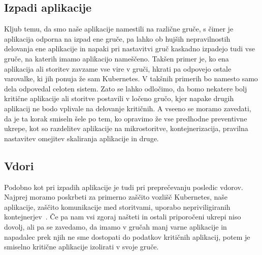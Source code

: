 \documentclass[a4paper, 12pt]{book}
\begin{document}
\subsection{Izpadi aplikacije}
Kljub temu, da smo naše aplikacije namestili na različne gruče, s čimer je aplikacija odporna na izpad ene gruče, pa lahko ob hujših nepravilnostih delovanja ene aplikacije in napaki pri nastavitvi gruč kaskadno izpadejo tudi vse gruče, na katerih imamo aplikacijo nameščeno.
Takšen primer je, ko ena aplikacija ali storitev zavzame vse vire v gruči, hkrati pa odpovejo ostale varovalke, ki jih ponuja že sam Kubernetes.
V takšnih primerih bo namesto samo dela odpovedal celoten sistem.
Zato se lahko odločimo, da bomo nekatere bolj kritične aplikacije ali storitve postavili v ločeno gručo, kjer napake drugih aplikacij ne bodo vplivale na delovanje kritičnih.
A vseeno se moramo zavedati, da je ta korak smiseln šele po tem, ko opravimo že vse predhodne preventivne ukrepe, kot so razdelitev aplikacije na mikrostoritve, kontejnerizacija, pravilna nastavitev omejitev skaliranja aplikacije in druge.
\subsection{Vdori}
Podobno kot pri izpadih aplikacije je tudi pri preprečevanju posledic vdorov.
Najprej moramo poskrbeti za primerno zaščito vozlišč Kubernetes, naše aplikacije, zaščito komunikacije med storitvami, uporabo nepriviligiranih kontejnerjev~\cite{securing-kube}.
Če pa nam vsi zgoraj našteti in ostali priporočeni ukrepi niso dovolj, ali pa se zavedamo, da imamo v gručah manj varne aplikacije in napadalec prek njih ne sme dostopati do podatkov kritičnih aplikacij, potem je smiselno kritične aplikacije izolirati v svoje gruče.
\end{document}
